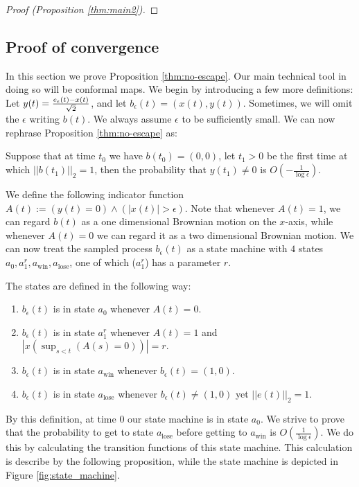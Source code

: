 {\begin{proof}[Proof (Proposition \ref{thm:main2})]
\end{proof}

\subsection{Proof of convergence}\label{sec:POC}
In this section we prove Proposition \ref{thm:no-escape}. Our main technical tool in doing so will
be conformal maps. We begin by introducing a few more definitions: Let
$y(t)=\frac{e_\epsilon(t)-x(t)}{\sqrt2}$, and let
${b}_\epsilon(t)=(x(t),y(t))$. Sometimes, we will omit the $\epsilon$ writing $b(t)$. We always assume $\epsilon$
to be sufficiently small. We can now rephrase Proposition
\ref{thm:no-escape} as:

\begin{propos}\label{prop:reph}
Suppose that at time $t_0$ we have
${b}(t_0)=(0,0)$, let $t_1>0$ be the first time at which
$||b(t_1)||_2=1$, then the probability that $y(t_1)\neq0$ is
$O\left(-\frac1{\log\epsilon}\right)$.
\end{propos}

We define the following indicator function
$A(t):=(y(t)=0)\wedge(|x(t)|>\epsilon)$. Note that whenever $A(t)=1$,
we can regard $b(t)$ as a one dimensional Brownian motion on the
$x$-axis, while whenever $A(t)=0$ we can regard it as a two
dimensional Brownian motion. We can now treat the sampled
process $b_\epsilon(t)$ as a state machine with $4$ states
$a_0,a^r_1,a_{\text{win}},a_{\text{lose}}$, one of which ($a^r_1$) has a parameter $r$.

The states are defined in the following way:
\begin{enumerate}
\item\label{n1} $b_\epsilon(t)$ is in state $a_0$ whenever $A(t)=0$.
\item\label{n2} $b_\epsilon(t)$ is in state $a^r_1$ whenever $A(t)=1$ and $|x(\sup_{s<t}(A(s)=0))|=r$.
\item\label{n3} $b_\epsilon(t)$ is in state $a_\text{win}$ whenever $b_\epsilon(t)=(1,0)$.
\item\label{n4} $b_\epsilon(t)$ is in state $a_\text{lose}$ whenever $b_\epsilon(t)\neq(1,0)$ yet $||e(t)||_2=1$.
\end{enumerate}

By this definition, at time $0$ our state machine is in state $a_0$.
We strive to prove that the probability to get to
 state $a_\text{lose}$ before getting to $a_\text{win}$ is $O(\frac1{\log\epsilon})$.
 We do this by calculating the transition functions of
 this state machine. This calculation is describe by the following proposition,
 while the state machine is depicted in Figure \ref{fig:state_machine}.

}
